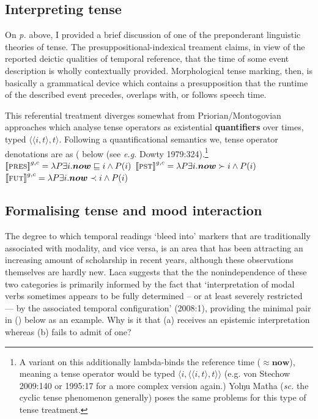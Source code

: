 \documentclass[12pt]{article}
\newcommand{\denote}[1]{\mbox{$[\![\mbox{#1}]\!]$}}
\newcommand{\la}{\langle}
\newcommand{\ra}{\rangle}
\begin{document}
\subsection{Interpreting tense}\label{intp}


On \textit{p.}\pageref{yol-infl} above, I provided a brief discussion of one of the preponderant linguistic theories of tense. The presuppositional-indexical treament claims, in view of the reported deictic qualities of temporal reference, that the time of some event description is wholly contextually provided. Morphological tense marking, then, is basically a grammatical device which contains a presupposition that the runtime of the described event precedes, overlaps with, or follows speech time.

This referential treatment diverges somewhat from Priorian/Montogovian approaches which analyse tense operators as existential \textbf{quantifiers} over times, typed $\la\la i,t\ra,t\ra$. Following a quantificational semantics we, tense operator denotations are as ( below  (see \textit{e.g.} Dowty 1979:324).\footnote{A variant on this additionally lambda-binds the reference time ($\approx\boldsymbol{now}$), meaning a tense operator would be typed $\la i,\la\la i,t\ra,t\ra\ra$ (e.g. von Stechow 2009:140 or 1995:17 for a more complex version again.) Yolŋu Matha (\textit{sc.} the cyclic tense phenomenon generally) poses the same problems for this type of tense treatment.} 
\pex\a$\denote{\textsc{pres}}^{g,c}=\lambda P\exists i.\boldsymbol{now}\sqsubseteq i\wedge P(i)$
\a$\denote{\textsc{pst}}^{g,c}=\lambda P\exists i.\boldsymbol{now}\succ i\wedge P(i)$
\a$\denote{\textsc{fut}}^{g,c}=\lambda P\exists i.\boldsymbol{now}\prec i\wedge P(i)$\xe


\subsection{Formalising tense and mood interaction}\label{ints}


The degree to which temporal readings `bleed into' markers that are traditionally associated with modality, and vice versa, is an area that has been attracting an increasing amount of scholarship in recent years, although these observations themselves are hardly new. Laca suggests that the the nonindependence of these two categories is primarily informed by the fact that `interpretation of modal verbs sometimes appears to be fully determined -- or at least severely restricted --- by the associated temporal configuration' (2008:1), providing the minimal pair in (\nextx) below as an example. Why is it that (a) receives an epistemic interpretation whereas (b) fails to admit of one?
\end{document}
